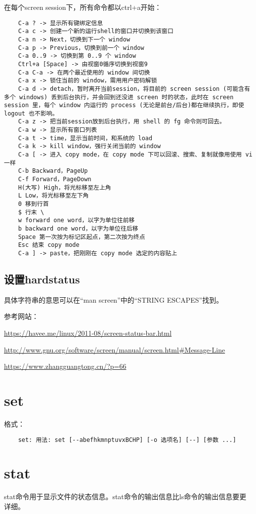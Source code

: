 \documentclass[a4paper,left=2.5cm,right=2.5cm,11pt]{article}
\begin{document}
	在每个screen session下，所有命令都以ctrl+a开始：
	\begin{lstlisting}
	C-a ? -> 显示所有键绑定信息 
	C-a c -> 创建一个新的运行shell的窗口并切换到该窗口 
	C-a n -> Next，切换到下一个 window 
	C-a p -> Previous，切换到前一个 window 
	C-a 0..9 -> 切换到第 0..9 个 window 
	Ctrl+a [Space] -> 由视窗0循序切换到视窗9 
	C-a C-a -> 在两个最近使用的 window 间切换 
	C-a x -> 锁住当前的 window，需用用户密码解锁 
	C-a d -> detach，暂时离开当前session，将目前的 screen session (可能含有多个 windows) 丢到后台执行，并会回到还没进 screen 时的状态，此时在 screen session 里，每个 window 内运行的 process (无论是前台/后台)都在继续执行，即使 logout 也不影响。 
	C-a z -> 把当前session放到后台执行，用 shell 的 fg 命令则可回去。 
	C-a w -> 显示所有窗口列表 
	C-a t -> time，显示当前时间，和系统的 load 
	C-a k -> kill window，强行关闭当前的 window 
	C-a [ -> 进入 copy mode，在 copy mode 下可以回滚、搜索、复制就像用使用 vi 一样 
	C-b Backward，PageUp 
	C-f Forward，PageDown 
	H(大写) High，将光标移至左上角 
	L Low，将光标移至左下角 
	0 移到行首 
	$ 行末 \
	w forward one word，以字为单位往前移 
	b backward one word，以字为单位往后移 
	Space 第一次按为标记区起点，第二次按为终点 
	Esc 结束 copy mode 
	C-a ] -> paste，把刚刚在 copy mode 选定的内容贴上
	\end{lstlisting}

\subsection{设置hardstatus}
	具体字符串的意思可以在“man screen”中的“STRING ESCAPES”找到。\par

	参考网站：\par
	\url{https://havee.me/linux/2011-08/screen-status-bar.html}\par
	\url{http://www.gnu.org/software/screen/manual/screen.html#Message-Line}\par
	\url{https://www.zhangguangtong.cn/?p=66}

\section{set}
	格式：
	\begin{lstlisting}
	set: 用法: set [--abefhkmnptuvxBCHP] [-o 选项名] [--] [参数 ...]
	\end{lstlisting}

\section{stat}
	stat命令用于显示文件的状态信息。stat命令的输出信息比ls命令的输出信息要更详细。\par
\end{document}
